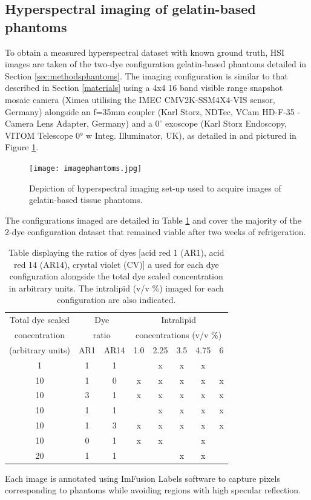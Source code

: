 \subsection{Hyperspectral imaging of gelatin-based phantoms}\label{sec:imagingphantoms}
To obtain a measured hyperspectral dataset with known ground truth, HSI images are taken of the two-dye configuration gelatin-based phantoms detailed in Section \ref{sec:methodsphantoms}. The imaging configuration is similar to that described in Section \ref{materials} using a 4x4 16 band visible range snapshot mosaic camera (Ximea utilising the IMEC CMV2K-SSM4X4-VIS sensor, Germany) alongside an f=35mm coupler (Karl Storz, NDTec, VCam HD-F-35 - Camera Lens Adapter, Germany) and a $0^\circ$ exoscope (Karl Storz Endoscopy, VITOM Telescope 0° w Integ. Illuminator, UK), as detailed in \cite{Ebner2021} and pictured in Figure \ref{fig:imagephantoms}.
\begin{figure}[h!]
    \centering
    \texttt{[image: imagephantoms.jpg]}
    \caption{Depiction of hyperspectral imaging set-up used to acquire images of gelatin-based tissue phantoms.}
    \label{fig:imagephantoms}
\end{figure}
The configurations imaged are detailed in Table \ref{tb:imagedphantoms} and cover the majority of the 2-dye configuration dataset that remained viable after two weeks of refrigeration. 
\begin{table}[ht!]
    \centering
    \caption{Table displaying the ratios of dyes [acid red 1 (AR1), acid red 14 (AR14), crystal violet (CV)] a used for each dye configuration alongside the total dye scaled concentration in arbitrary units. The intralipid (v/v \%) imaged for each configuration are also indicated.}
    \begin{tabular}{|c|c|c|c|c|c|c|c|}
        \hline
        Total dye scaled & \multicolumn{2}{|c|}{Dye } & \multicolumn{5}{c|}{Intralipid } \\
        concentration & \multicolumn{2}{|c|}{ratio} & \multicolumn{5}{c|}{concentrations (v/v \%)} \\
        (arbitrary units) & AR1 & AR14 & 1.0 & 2.25 & 3.5 & 4.75 & 6 \\
        \hline
        1 & 1 & 1 & & x & x & x & \\
        10 & 1 & 0 & x & x & x & x & x \\
        10 & 3 & 1 & x & x & x & x & x \\
        10 & 1 & 1 &  & x & x & x & x \\
        10 & 1 & 3 & x & x & x & x & x \\
        10 & 0 & 1 & x & x &  & x & \\
        20 & 1 & 1 &  & & x & x &  \\
        \hline
    \end{tabular}
    \label{tb:imagedphantoms}
\end{table}
Each image is annotated using ImFusion Labels software to capture pixels corresponding to phantoms while avoiding regions with high specular reflection. 

